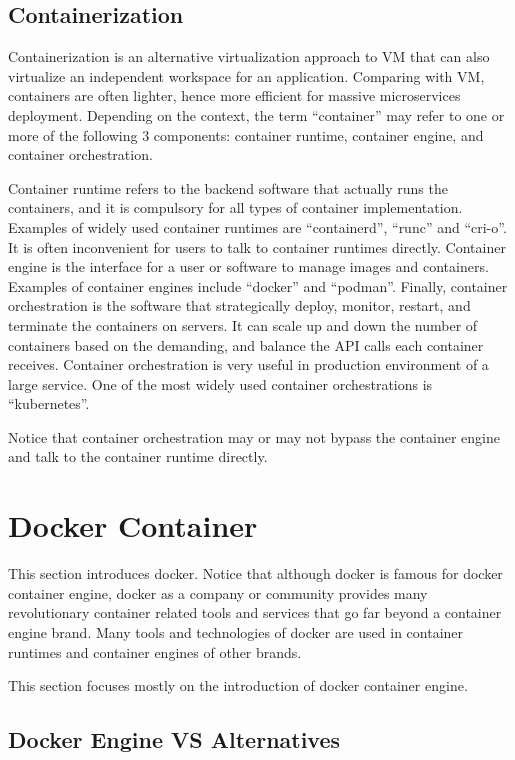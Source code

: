 \subsection{Containerization}

Containerization is an alternative virtualization approach to VM that can also virtualize an independent workspace for an application. Comparing with VM, containers are often lighter, hence more efficient for massive microservices deployment. Depending on the context, the term ``container'' may refer to one or more of the following 3 components: container runtime, container engine, and container orchestration.

Container runtime refers to the backend software that actually runs the containers, and it is compulsory for all types of container implementation. Examples of widely used container runtimes are ``containerd'', ``runc'' and ``cri-o''. It is often inconvenient for users to talk to container runtimes directly. Container engine is the interface for a user or software to manage images and containers. Examples of container engines include ``docker'' and ``podman''. Finally, container orchestration is the software that strategically deploy, monitor, restart, and terminate the containers on servers. It can scale up and down the number of containers based on the demanding, and balance the API calls each container receives. Container orchestration is very useful in production environment of a large service. One of the most widely used container orchestrations is ``kubernetes''.

Notice that container orchestration may or may not bypass the container engine and talk to the container runtime directly.

\section{Docker Container} \label{ch:vac:sec:dc}

This section introduces docker. Notice that although docker is famous for docker container engine, docker as a company or community provides many revolutionary container related tools and services that go far beyond a container engine brand. Many tools and technologies of docker are used in container runtimes and container engines of other brands.

This section focuses mostly on the introduction of docker container engine.

\subsection{Docker Engine VS Alternatives}

